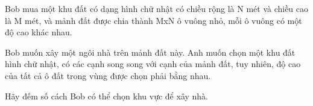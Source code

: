 Bob mua một khu đất có dạng hình chữ nhật có chiều rộng là N mét và chiều cao là M mét, và mảnh đất được chia thành MxN ô vuông nhỏ, mỗi ô vuông có một độ cao khác nhau.

Bob muốn xây một ngôi nhà trên mảnh đất này. Anh muốn chọn một khu đất hình chữ nhật, có các cạnh song song với cạnh của mảnh đất, tuy nhiên, độ cao của tất cả ô đất trong vùng được chọn phải bằng nhau.

Hãy đếm số cách Bob có thể chọn khu vực để xây nhà.